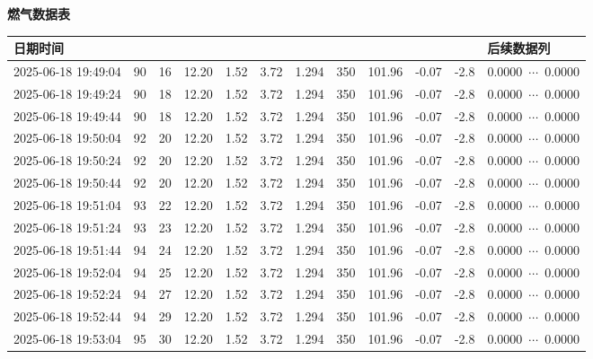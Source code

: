 \documentclass[UTF8,10pt,a4paper,fontset=fandol]{ctexart}
\begin{document}
\begin{center}
\scriptsize
\textbf{燃气数据表}

\begin{tabular}{|p{1.55cm}|c|c|c|c|c|c|c|c|c|c|p{3.0cm}|}
\hline
日期时间 &  &  &  &  &  &  &  &  &  &  & 后续数据列 \\
\hline
2025-06-18 19:49:04 & 90 & 16 & 12.20 & 1.52 & 3.72 & 1.294 & 350 & 101.96 & -0.07 & -2.8 & 0.0000\ $\cdots$\ 0.0000 \\
2025-06-18 19:49:24 & 90 & 18 & 12.20 & 1.52 & 3.72 & 1.294 & 350 & 101.96 & -0.07 & -2.8 & 0.0000\ $\cdots$\ 0.0000 \\
2025-06-18 19:49:44 & 90 & 18 & 12.20 & 1.52 & 3.72 & 1.294 & 350 & 101.96 & -0.07 & -2.8 & 0.0000\ $\cdots$\ 0.0000 \\
2025-06-18 19:50:04 & 92 & 20 & 12.20 & 1.52 & 3.72 & 1.294 & 350 & 101.96 & -0.07 & -2.8 & 0.0000\ $\cdots$\ 0.0000 \\
2025-06-18 19:50:24 & 92 & 20 & 12.20 & 1.52 & 3.72 & 1.294 & 350 & 101.96 & -0.07 & -2.8 & 0.0000\ $\cdots$\ 0.0000 \\
2025-06-18 19:50:44 & 92 & 20 & 12.20 & 1.52 & 3.72 & 1.294 & 350 & 101.96 & -0.07 & -2.8 & 0.0000\ $\cdots$\ 0.0000 \\
2025-06-18 19:51:04 & 93 & 22 & 12.20 & 1.52 & 3.72 & 1.294 & 350 & 101.96 & -0.07 & -2.8 & 0.0000\ $\cdots$\ 0.0000 \\
2025-06-18 19:51:24 & 93 & 23 & 12.20 & 1.52 & 3.72 & 1.294 & 350 & 101.96 & -0.07 & -2.8 & 0.0000\ $\cdots$\ 0.0000 \\
2025-06-18 19:51:44 & 94 & 24 & 12.20 & 1.52 & 3.72 & 1.294 & 350 & 101.96 & -0.07 & -2.8 & 0.0000\ $\cdots$\ 0.0000 \\
2025-06-18 19:52:04 & 94 & 25 & 12.20 & 1.52 & 3.72 & 1.294 & 350 & 101.96 & -0.07 & -2.8 & 0.0000\ $\cdots$\ 0.0000 \\
2025-06-18 19:52:24 & 94 & 27 & 12.20 & 1.52 & 3.72 & 1.294 & 350 & 101.96 & -0.07 & -2.8 & 0.0000\ $\cdots$\ 0.0000 \\
2025-06-18 19:52:44 & 94 & 29 & 12.20 & 1.52 & 3.72 & 1.294 & 350 & 101.96 & -0.07 & -2.8 & 0.0000\ $\cdots$\ 0.0000 \\
2025-06-18 19:53:04 & 95 & 30 & 12.20 & 1.52 & 3.72 & 1.294 & 350 & 101.96 & -0.07 & -2.8 & 0.0000\ $\cdots$\ 0.0000 \\

\end{tabular}
\end{center}
\end{document}
